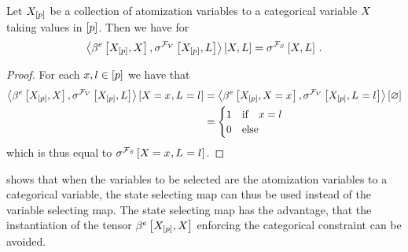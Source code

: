 \begin{lemma}
    \label{lem:stateSelectorVsVariableSelector}
    Let $X_{[p]}$ be a collection of atomization variables to a categorical variable $X$ taking values in $[p]$.
    Then we have for
    \begin{align*}
        \left\langle \beta^{e}\left[X_{[p]},X\right],
            \sigma^{\mathcal{F}_{V}}\left[X_{[p]},L\right]
        \right\rangle \left[ X,L \right]
        =
        \sigma^{\mathcal{F}_{S}}\left[X,L\right] \, .
    \end{align*}
\end{lemma}
\begin{proof}
    For each $x,l\in[p]$ we have that
    \begin{align*}
        \left\langle \beta^{e}\left[X_{[p]},X\right],
            \sigma^{\mathcal{F}_{V}}\left[X_{[p]},L\right]
        \right\rangle \left[ X_{}=x_{},L_{}=l_{} \right]
        &=
        \left\langle \beta^{e}\left[X_{[p]},X_{}=x_{}\right],
            \sigma^{\mathcal{F}_{V}}\left[X_{[p]},L_{}=l_{}\right]
        \right\rangle \left[ \varnothing \right] \\
        &= \begin{cases}
               1 & \text{if}\quad x = l \\
               0 & \text{else}
        \end{cases}
    \end{align*}
    which is thus equal to $\sigma^{\mathcal{F}_{S}}\left[X_{}=x_{},L_{}=l_{}\right]$.
\end{proof}

 shows that when the variables to be selected are the atomization variables to a categorical variable, the state selecting map can thus be used instead of the variable selecting map.
The state selecting map has the advantage, that the instantiation of the tensor $\beta^{e}\left[X_{[p]},X\right]$ enforcing the categorical constraint can be avoided.



